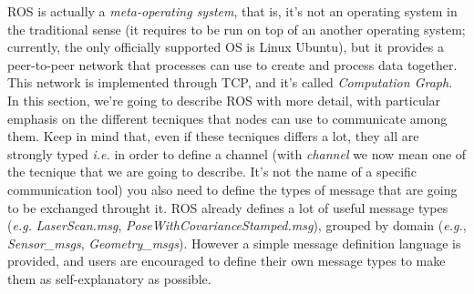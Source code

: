\ac{ROS} is actually a \textit{meta-operating system}, that is, it's not an operating system in the traditional sense (it requires to be run on top of an another operating system; currently, the only officially supported OS is Linux Ubuntu), but it provides a peer-to-peer network that processes can use to create and process data together. This network is implemented through TCP, and it's called \textit{Computation Graph}. In this section, we're going to describe \ac{ROS} with more detail, with particular emphasis on the different tecniques that nodes can use to communicate among them. Keep in mind that, even if these tecniques differs a lot, they all are strongly typed \textit{i.e.} in order to define a channel (with \textit{channel} we now mean one of the tecnique that we are going to describe. It's not the name of a specific communication tool) you also need to define the types of message that are going to be exchanged throught it. \ac{ROS} already defines a lot of useful message types (\textit{e.g.} \textit{LaserScan.msg}, \textit{PoseWithCovarianceStamped.msg}), grouped by domain (\textit{e.g.}, \textit{Sensor\_msgs}, \textit{Geometry\_msgs}). However a simple message definition language is provided, and users are encouraged to define their own message types to make them as self-explanatory as possible.

